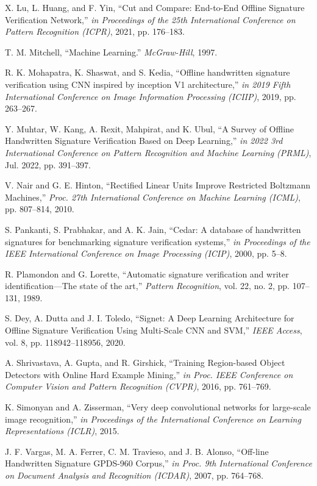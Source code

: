 \begin{thebibliography}{10}
X. Lu, L. Huang, and F. Yin, ``Cut and Compare: End-to-End Offline Signature Verification Network,'' {\em in Proceedings of the 25th International Conference on Pattern Recognition (ICPR)},
2021, pp. 176--183.

T. M. Mitchell, ``Machine Learning.'' {\em McGraw-Hill},
1997.

R. K. Mohapatra, K. Shaswat, and S. Kedia, ``Offline handwritten signature verification using CNN inspired by inception V1 architecture,'' {\em in 2019 Fifth International Conference on Image Information Processing (ICIIP)},
2019, pp. 263--267.

Y. Muhtar, W. Kang, A. Rexit, Mahpirat, and K. Ubul, ``A Survey of Offline Handwritten Signature Verification Based on Deep Learning,'' {\em in 2022 3rd International Conference on Pattern Recognition and Machine Learning (PRML)},
Jul. 2022, pp. 391--397.

V. Nair and G. E. Hinton, ``Rectified Linear Units Improve Restricted Boltzmann Machines,'' {\em Proc. 27th International Conference on Machine Learning (ICML)}, pp. 807--814,
2010.

S. Pankanti, S. Prabhakar, and A. K. Jain, ``Cedar: A database of handwritten signatures for benchmarking signature verification systems,'' {\em in Proceedings of the IEEE International Conference on Image Processing (ICIP)},
2000, pp. 5--8.

R. Plamondon and G. Lorette, ``Automatic signature verification and writer identification—The state of the art,'' {\em Pattern Recognition}, vol. 22, no. 2, pp. 107--131,
1989.

S. Dey, A. Dutta and J. I. Toledo, ``Signet: A Deep Learning Architecture for Offline Signature Verification Using Multi-Scale CNN and SVM,'' {\em IEEE Access}, vol. 8, pp. 118942--118956,
2020.

A. Shrivastava, A. Gupta, and R. Girshick, ``Training Region-based Object Detectors with Online Hard Example Mining,'' {\em in Proc. IEEE Conference on Computer Vision and Pattern Recognition (CVPR)},
2016, pp. 761--769.

K. Simonyan and A. Zisserman, ``Very deep convolutional networks for large-scale image recognition,'' {\em in Proceedings of the International Conference on Learning Representations (ICLR)},
2015.

J. F. Vargas, M. A. Ferrer, C. M. Travieso, and J. B. Alonso, ``Off-line Handwritten Signature GPDS-960 Corpus,'' {\em in Proc. 9th International Conference on Document Analysis and Recognition (ICDAR)},
2007, pp. 764--768.


\end{thebibliography}
